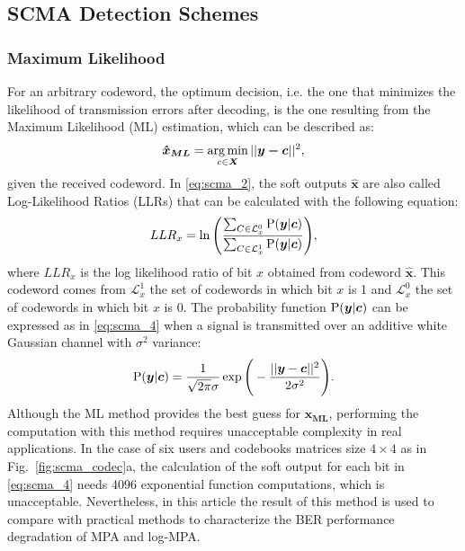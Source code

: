\subsection{SCMA Detection Schemes}
\label{sec:scma_detection}

\subsubsection{Maximum Likelihood}
\label{sec:scma_ml}

For an arbitrary codeword, the optimum decision, i.e. the one that minimizes the
likelihood of transmission errors after decoding, is the one resulting from the
Maximum Likelihood (ML) estimation, which can be described as:
\begin{equation}
  \label{eq:scma_2}
  \bm{\hat{x}_{ML}} = \operatorname*{arg\,min}_{c \in \bm{X}}||\bm{y - c}||^2,
\end{equation}
given the received codeword. In \eqref{eq:scma_2}, the soft outputs
$\hat{\bm{x}}$ are also called Log-Likelihood Ratios (LLRs) that can be
calculated with the following equation:
\begin{equation}
  \label{eq:scma_3}
  LLR_x = \ln\Bigg(\frac{\sum_{C\in\mathcal{L}_x^0} \operatorname{P}(\bm{y}|\bm{c})}
  {\sum_{C\in\mathcal{L}_x^1} \operatorname{P}(\bm{y}|\bm{c})}\Bigg),
\end{equation}
where $LLR_x$ is the log likelihood ratio of bit $x$ obtained from codeword
$\hat{\bm{x}}$. This codeword comes from $\mathcal{L}_x^1$ the set of codewords
in which bit $x$ is 1 and $\mathcal{L}_x^0$ the set of codewords in which bit
$x$ is 0. The probability function $\operatorname{P}(\bm{y}|\bm{c})$ can be expressed as
in \eqref{eq:scma_4} when a signal is transmitted over an additive white
Gaussian channel with $\sigma^2$ variance:
\begin{equation}
  \label{eq:scma_4}
  \operatorname{P}(\bm{y}|\bm{c}) = \frac{1}{\sqrt{2\pi}\sigma}\exp
  \Bigg(-\frac{||\bm{y}-\bm{c}||^2}{2\sigma^2}\Bigg).
\end{equation}
Although the ML method provides the best guess for $\bm{\hat{x}_{ML}}$,
performing the computation with this method requires unacceptable complexity in
real applications. In the case of six users and codebooks matrices size
$4\times4$ as in Fig.~\ref{fig:scma_codec}a, the calculation of the soft output
for each bit in \eqref{eq:scma_4} needs 4096 exponential function computations,
which is unacceptable. Nevertheless, in this article the result of this method
is used to compare with practical methods to characterize the BER performance
degradation of MPA and log-MPA.

